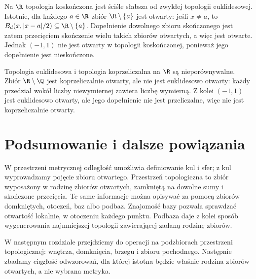 \begin{przyklad}
\label{ex:topog-porownanie-r}
Na $\R$ topologia koskończona jest ściśle słabsza od
zwykłej topologii euklidesowej. Istotnie, dla każdego
$a\in\R$ zbiór $\R\setminus\{a\}$ jest otwarty:
jeśli $x\ne a$, to
$B_d(x,|x-a|/2)\subseteq\R\setminus\{a\}$.
Dopełnienie dowolnego zbioru skończonego jest zatem
przecięciem skończenie wielu takich zbiorów otwartych,
a więc jest otwarte. Jednak $(-1,1)$ nie jest otwarty
w topologii koskończonej, ponieważ jego dopełnienie
jest nieskończone.

Topologia euklidesowa i topologia koprzeliczalna
na $\R$ są nieporównywalne. Zbiór
$\R\setminus\Q$ jest koprzeliczalnie otwarty,
ale nie jest euklidesowo otwarty: każdy przedział
wokół liczby niewymiernej zawiera liczbę wymierną.
Z kolei $(-1,1)$ jest euklidesowo otwarty,
ale jego dopełnienie nie jest przeliczalne,
więc nie jest koprzeliczalnie otwarty.
\end{przyklad}

\section{Podsumowanie i dalsze powiązania}
\label{sec:topog-podsumowanie}

W przestrzeni metrycznej odległość umożliwia definiowanie
kul i sfer; z kul wyprowadzamy pojęcie zbioru otwartego.
Przestrzeń topologiczna to zbiór wyposażony w rodzinę zbiorów
otwartych, zamkniętą na dowolne sumy i skończone przecięcia.
Te same informacje można opisywać za pomocą zbiorów
domkniętych, otoczeń, baz albo podbaz. Znajomość bazy
pozwala sprawdzać otwartość lokalnie, w otoczeniu każdego
punktu. Podbaza daje z kolei sposób wygenerowania
najmniejszej topologii zawierającej zadaną rodzinę zbiorów.

W następnym rozdziale przejdziemy do operacji na podzbiorach
przestrzeni topologicznej: wnętrza, domknięcia, brzegu i zbioru
pochodnego. Następnie zbadamy ciągłość odwzorowań, dla której
istotna będzie właśnie rodzina zbiorów otwartych,
a nie wybrana metryka.
